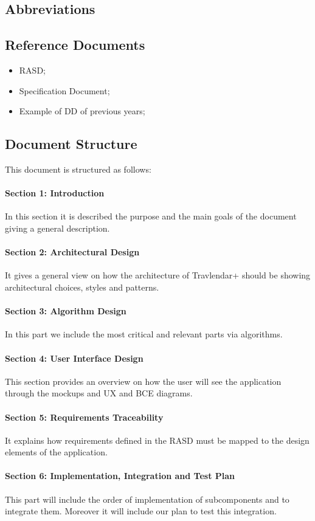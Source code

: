 \documentclass[12pt,titlepage]{article}
\begin{document}
\subsection{Abbreviations}

\subsection{Reference Documents}
\begin{itemize}
\item RASD;
\item Specification Document;
\item Example of DD of previous years;
\end{itemize}
\subsection{Document Structure}
This document is structured as follows:
\paragraph{Section 1: Introduction}
In this section it is described the purpose and the main goals  of the document giving a general description.
\paragraph{Section 2: Architectural Design}
It gives a general view on how the architecture of Travlendar+ should be showing architectural choices, styles and patterns.
\paragraph{Section 3: Algorithm Design}
In this part we include the most critical and relevant parts via algorithms.
\paragraph{Section 4: User Interface Design}
This section provides an overview on how the user will see the application through the mockups and UX and BCE diagrams.
\paragraph{Section 5: Requirements Traceability}
It explains how requirements defined in the RASD must be mapped to the design elements of the application.
\paragraph{Section 6: Implementation, Integration and Test Plan}
This part will include the order of implementation of subcomponents and to integrate them. Moreover it will include our plan to test this integration.
\end{document}
